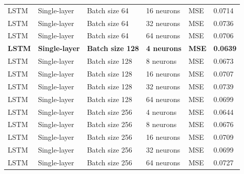 \begin{landscape}
\begin{longtable}{p{2.2cm}p{3cm}p{3.5cm}p{3.2cm}p{1.6cm}p{1.8cm}}
LSTM & Single-layer & Batch size 64  & 16 neurons & MSE  & 0.0714 \\
LSTM & Single-layer & Batch size 64  & 32 neurons & MSE  & 0.0736 \\
LSTM & Single-layer & Batch size 64  & 64 neurons & MSE  & 0.0706 \\
\textbf{LSTM} & \textbf{Single-layer} & \textbf{Batch size 128} & \textbf{4 neurons} & \textbf{MSE} & \textbf{0.0639} \\
LSTM & Single-layer & Batch size 128 & 8 neurons  & MSE  & 0.0673 \\
LSTM & Single-layer & Batch size 128 & 16 neurons & MSE  & 0.0707 \\
LSTM & Single-layer & Batch size 128 & 32 neurons & MSE  & 0.0739 \\
LSTM & Single-layer & Batch size 128 & 64 neurons & MSE  & 0.0699 \\
LSTM & Single-layer & Batch size 256 & 4 neurons  & MSE  & 0.0644 \\
LSTM & Single-layer & Batch size 256 & 8 neurons  & MSE  & 0.0676 \\
LSTM & Single-layer & Batch size 256 & 16 neurons & MSE  & 0.0709 \\
LSTM & Single-layer & Batch size 256 & 32 neurons & MSE  & 0.0699 \\
LSTM & Single-layer & Batch size 256 & 64 neurons & MSE  & 0.0727 \\


\end{longtable}
\end{landscape}
